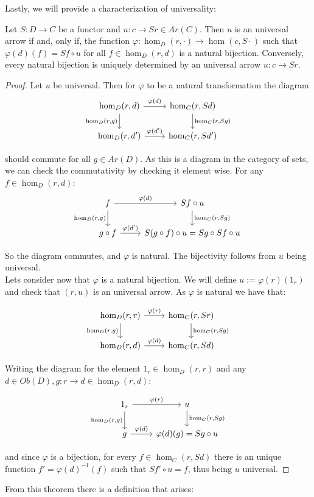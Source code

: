     
  Lastly, we will provide a characterization of universality:
  \begin{proposition}\label{Yoneda-proposition}
      Let $S: D \to C$ be a functor and $u:c\to Sr\in Ar(C)$. Then $u$ is an universal arrow if and, only if, the function $\varphi:\hom_D(r,\cdot)\to \hom(c,S\cdot)$ such that $\varphi(d)(f)= Sf\circ u$ for all $f\in \hom_D(r,d)$ is a natural bijection. Conversely, every natural bijection is uniquely determined by an universal arrow $u:c\to Sr$. 
  \end{proposition}
  \begin{proof}
    Let $u$ be universal. Then for $\varphi$ to be a natural transformation the diagram 
    \[
      \begin{tikzcd}
        \hom_D(r,d)\arrow[swap]{d}{\hom_D(r,g)}\arrow{r}{\varphi(d)} & \hom_C(r,Sd)\arrow{d}{\hom_C(r,Sg)}\\
        \hom_D(r,d')\arrow{r}{\varphi(d')} & \hom_C(r,Sd')
      \end{tikzcd}
    \]

    should commute for all $g\in Ar(D)$. As this is a diagram in the category of sets, we can check the commutativity by checking it element wise. For any $f \in\hom_D(r,d)$:
    \[
      \begin{tikzcd}
        f\arrow[swap]{d}{\hom_D(r,g)}\arrow{r}{\varphi(d)} & Sf\circ u \arrow{d}{\hom_C(r,Sg)}\\
        g\circ f \arrow{r}{\varphi(d')} & S(g\circ f) \circ u = Sg\circ Sf \circ u
      \end{tikzcd}
    \]

    So the diagram commutes, and $\varphi$ is natural. The bijectivity follows from $u$ being universal.\\

    Lets consider now that $\varphi$ is a natural bijection. We will define $u := \varphi(r)(1_r)$ and check that $(r,u)$ is an universal arrow. As $\varphi$ is natural we have that:

    \[
      \begin{tikzcd}
        \hom_D(r,r)\arrow[swap]{d}{\hom_D(r,g)}\arrow{r}{\varphi(r)} & \hom_C(r,Sr)\arrow{d}{\hom_C(r,Sg)}\\
        \hom_D(r,d)\arrow{r}{\varphi(d)} & \hom_C(r,Sd)
      \end{tikzcd}
    \]

    Writing the diagram for the element $1_r\in\hom_D(r,r)$ and any $d\in Ob(D), g:r\to d\in \hom_D(r,d)$:

    \[
      \begin{tikzcd}
        1_r \arrow[swap]{d}{\hom_D(r,g)}\arrow{r}{\varphi(r)} & u \arrow{d}{\hom_C(r,Sg)}\\
        g\arrow{r}{\varphi(d)} & \varphi(d)(g)= Sg\circ u
      \end{tikzcd}
    \]

    and since $\varphi$ is a bijection, for every $f\in \hom_C(r,Sd)$ there is an unique function $f' = \varphi(d)^{-1}(f)$ such that $Sf'\circ u = f$, thus being $u$ universal.

\end{proof}
From this theorem there is a definition that arises:

